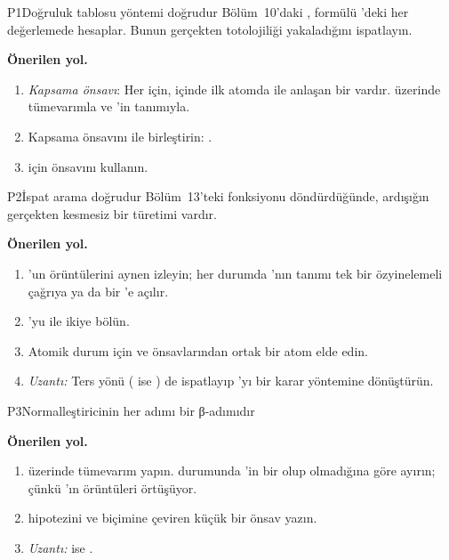 \begin{projekarti}{P1}{Doğruluk tablosu yöntemi doğrudur}
Bölüm~10'daki , formülü 'deki her
değerlemede hesaplar. Bunun gerçekten totolojiliği yakaladığını ispatlayın.


\textbf{Önerilen yol.}
\begin{enumerate}[nosep]
  \item \emph{Kapsama önsavı}: Her  için, 
        içinde ilk  atomda  ile anlaşan bir  vardır.
         üzerinde tümevarımla ve 'in tanımıyla.
  \item Kapsama önsavını  ile birleştirin: .
  \item {} için  önsavını kullanın.
\end{enumerate}
\end{projekarti}

\begin{projekarti}{P2}{İspat arama doğrudur}
Bölüm~13'teki  fonksiyonu  döndürdüğünde, ardışığın gerçekten
kesmesiz bir türetimi vardır.


\textbf{Önerilen yol.}
\begin{enumerate}[nosep]
  \item {}'un örüntülerini aynen izleyin; her durumda 'nın
        tanımı tek bir özyinelemeli çağrıya ya da bir \lc{\&\&}'e açılır.
  \item {}'yu  ile ikiye bölün.
  \item Atomik durum için  ve 
        önsavlarından ortak bir atom elde edin.
  \item \emph{Uzantı:} Ters yönü ( ise ) de
        ispatlayıp 'yı bir karar yöntemine dönüştürün.
\end{enumerate}
\end{projekarti}

\begin{projekarti}{P3}{Normalleştiricinin her adımı bir β-adımıdır}

\textbf{Önerilen yol.}
\begin{enumerate}[nosep]
  \item {} üzerinde tümevarım yapın.  durumunda
        'in bir  olup olmadığına göre ayırın; çünkü
        'ın örüntüleri örtüşüyor.
  \item {} hipotezini  ve  biçimine çeviren küçük bir önsav yazın.
  \item \emph{Uzantı:}  ise .
\end{enumerate}
\end{projekarti}

